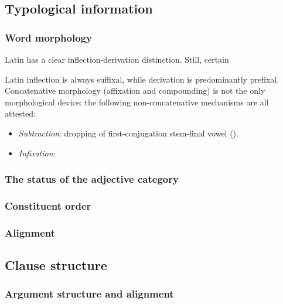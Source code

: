 \documentclass{article}
\begin{document}
\subsection{Typological information}

\subsubsection{Word morphology}

Latin has a clear inflection-derivation distinction.
Still, certain 

Latin inflection is always suffixal,
while derivation is predominantly prefixal.
Concatenative morphology (affixation and compounding) 
is not the only morphological device:
the following non-concatenative mechanisms are all attested:
\begin{itemize}
    \item \emph{Subtraction}: dropping of first-conjugation stem-final vowel ().
    \item \emph{Infixation}:  %
\end{itemize}

\subsubsection{The status of the adjective category}

\subsubsection{Constituent order}

\subsubsection{Alignment}

\subsection{Clause structure}\label{sec:clause-structure-abs}

\subsubsection{Argument structure and alignment}\label{sec:alignment-abs}
\end{document}
